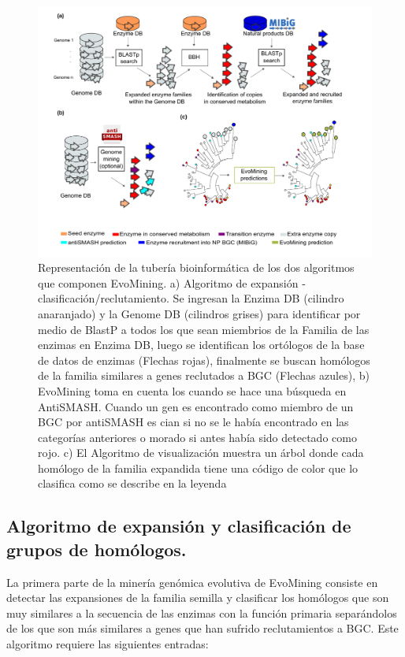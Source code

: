 \documentclass[12pt,twoside]{reedthesis}
\begin{document}
  \begin{figure}[h!tbp]
  \centering
  \includegraphics[angle = 0,scale = .8]{chapter2/FigurasPaper/Figure1.pdf}
  \caption[EvoMining Algorithm]{\footnotesize{Representación de la tubería bioinformática de los dos algoritmos que componen EvoMining. a) Algoritmo de expansión - clasificación/reclutamiento. Se ingresan la Enzima DB (cilindro anaranjado) y la Genome DB (cilindros grises) para identificar por medio de BlastP a todos los que sean miembrios de la Familia de las enzimas en Enzima DB, luego se identifican los ortólogos de la base de datos de enzimas (Flechas rojas), finalmente se buscan homólogos de la familia similares a genes reclutados a BGC (Flechas azules),  b) EvoMining toma en cuenta los cuando se hace una búsqueda en AntiSMASH. Cuando un  gen es encontrado como miembro de un BGC por antiSMASH es cian si no se le había encontrado en las categorías anteriores o morado si antes había sido detectado como rojo. c) El Algoritmo de visualización muestra un árbol donde cada homólogo de la familia expandida tiene una código de color que lo clasifica como se describe en la leyenda}}
  \label{fig:EvoMiningAlgorithms}
  \end{figure}
  
  \subsection{Algoritmo de expansión y clasificación de grupos de
  homólogos.}\label{algoritmo-de-expansion-y-clasificacion-de-grupos-de-homologos.}
  
  La primera parte de la minería genómica evolutiva de EvoMining consiste
  en detectar las expansiones de la familia semilla y clasificar los
  homólogos que son muy similares a la secuencia de las enzimas con la
  función primaria separándolos de los que son más similares a genes que
  han sufrido reclutamientos a BGC. Este algoritmo requiere las siguientes
  entradas:
  
\end{document}
